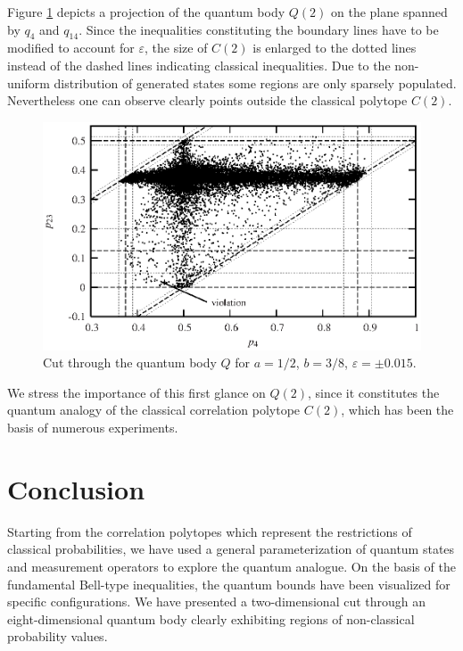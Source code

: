Figure \ref{f-2003-bell2hull}
depicts a projection of the quantum body $Q(2)$ on
the plane spanned by $q_{4}$ and $q_{14}$. Since the
inequalities constituting the boundary lines have to be modified to
account for $\varepsilon$, the size of $C(2)$ is enlarged
to the dotted lines instead of the dashed lines indicating classical
inequalities. Due to the non-uniform distribution of generated
states some regions are only sparsely populated.
Nevertheless one can
observe clearly points outside the classical polytope $C(2)$.
\begin{figure}[htbp]
  \centering
  \includegraphics{2003-qpoly-bell2}
  \caption{Cut through the quantum body $Q$ for $a=1/2$, $b=3/8$, $\varepsilon=\pm 0.015$.}
  \label{f-2003-bell2hull}
\end{figure}
We stress the importance of this first glance on $Q(2)$,
since it constitutes the quantum analogy
of the classical correlation polytope $C(2)$,
which has been the
basis of numerous experiments.


\section{Conclusion}

Starting from the correlation polytopes
which represent the restrictions of classical probabilities,
we have used a general parameterization of quantum states and
measurement operators to explore the quantum analogue.
On the basis of the fundamental Bell-type inequalities, the quantum
bounds have been visualized for specific configurations.
We have
presented a
two-dimensional cut through an eight-dimensional quantum body
clearly
exhibiting regions of non-classical probability values.


